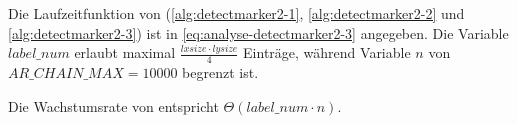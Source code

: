 Die Laufzeitfunktion von  (\autoref{alg:detectmarker2-1}, \autoref{alg:detectmarker2-2} und
 \autoref{alg:detectmarker2-3}) ist in \autoref{eq:analyse-detectmarker2-3} angegeben. Die Variable
 $\mathit{label\_num}$ erlaubt maximal $\tfrac{\mathit{lxsize}\cdot\mathit{lysize}}{4}$ Einträge, während Variable $n$
 von $\mathit{AR\_CHAIN\_MAX} = 10000$ begrenzt ist.

Die Wachstumsrate von  entspricht $\Theta(\mathit{label\_num}\cdot n)$.




% 



